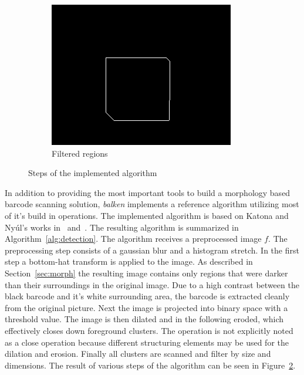 \documentclass[runningheads,a4paper]{llncs}
\begin{document}
\begin{figure}
\begin{subfigure}{.3\textwidth}
  \includegraphics[width=\linewidth]{images/fifth}
  \caption{Filtered regions}
  \label{fig:sfig2}
\end{subfigure}
\caption{Steps of the implemented algorithm}
\label{fig:algo}
\end{figure}

In addition to providing the most important tools to build a morphology based
barcode scanning solution, \emph{balken} implements a reference algorithm
utilizing most of it's build in operations.
The implemented algorithm is based on Katona and Nyúl's works
in~\cite{katona2012novel} and~\cite{katona2013efficient}. The resulting algorithm
is summarized in Algorithm~\ref{alg:detection}. The algorithm receives a
preprocessed image $f$. The preprocessing step consists of a gaussian blur and a
histogram stretch. In the first step a bottom-hat transform is applied to the
image. As described in Section~\ref{sec:morph} the resulting image contains only regions
that were darker than their surroundings in the original image. Due to a high
contrast between the black barcode and it's white surrounding area, the barcode
is extracted cleanly from the original picture. Next the image
is projected into binary space with a threshold value. The image is then dilated
and in the following eroded, which effectively closes down foreground clusters.
The operation is not explicitly noted as a close operation because different
structuring elements may be used for the dilation and erosion.
Finally all clusters are scanned and filter by size and dimensions.
The result of various steps of the algorithm can be seen in Figure~\ref{fig:algo}.
\end{document}
